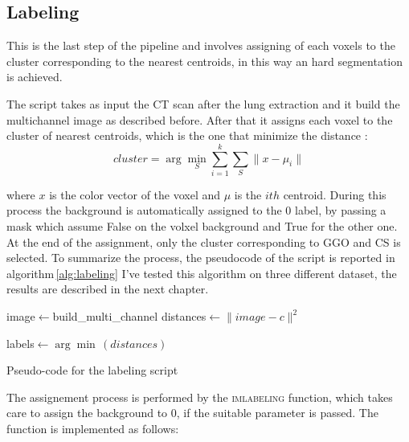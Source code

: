 
	
	\subsection{Labeling}
	
	
	
	
	This is the last step of the pipeline and involves assigning of  each voxels to the cluster corresponding to the nearest centroids, in this way an hard segmentation is achieved.
	
	The script takes as input the CT scan after the lung extraction and it build the multichannel image as described before. After that it assigns each voxel to the cluster of nearest centroids, which is the one that minimize the distance : 
	\begin{equation}
		cluster = \arg\min_{S}  \sum_{i=1}^k \sum_{S} \| x - \mu_i\|
	\end{equation}
	
	where $x$ is the color vector of the voxel and $\mu$ is the $ith$ centroid. During this process the background is automatically assigned to the 0 label, by passing a mask which assume False on the volxel background and True for the other one. At the end of the assignment, only the cluster corresponding to GGO and CS is selected.
	To summarize the process, the pseudocode of the script is reported in algorithm\,\ref{alg:labeling}
	I've tested this algorithm on three different dataset, the results are described in the next chapter.
	
	\begin{algorithm}
		
		\SetAlgoLined
		\DontPrintSemicolon
		
		
		
		image$\leftarrow$build\_multi\_channel\;
		{
			distances$\leftarrow\| image - c\|^2$\;
		}
		
		labels$\leftarrow\arg\min\,(distances)$\;
		
		\caption{Pseudo-code for the labeling script}\label{alg:labeling}
		
	\end{algorithm}
	

	The assignement process is performed by the \textsc{imlabeling} function, which takes care to assign the background to $0$, if the suitable parameter is passed.  The function is implemented as follows:
		
